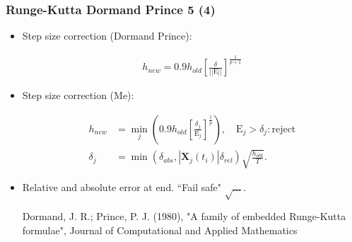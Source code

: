 \documentclass{beamer}
\begin{document}
\begin{frame}
\frametitle{Runge-Kutta Dormand Prince 5 (4)}

\begin{itemize}
\item <1-> Step size correction (Dormand Prince):

\begin{align*}
h_{new} = 0.9 h_{old} \left[\frac{\delta }{||\mathrm{E}||}\right]^{\frac{1}{p+1}}
\end{align*}

\item <2-> Step size correction (Me):

\begin{align*}
h_{new} &= \min_j \left(0.9 h_{old} \left[\frac{\delta_j}{\mathrm{E}_{j}}\right]^{\frac{1}{p}}\right), \quad \mathrm{E}_j>\delta_j : \mathrm{reject}\\
\delta_j &=\min(\delta_{abs},|\mathbf{X}_j(t_{i})|\delta_{rel})\sqrt{\frac{h_{old}}{T}}.
\end{align*}

\item <3-> Relative and absolute error at end. ``Fail safe" $\sqrt{\ldots}$.

{\color{gray} Dormand, J. R.; Prince, P. J. (1980), "A family of embedded Runge-Kutta formulae", Journal of Computational and Applied Mathematics}
\end{itemize}
\end{frame}
\end{document}

